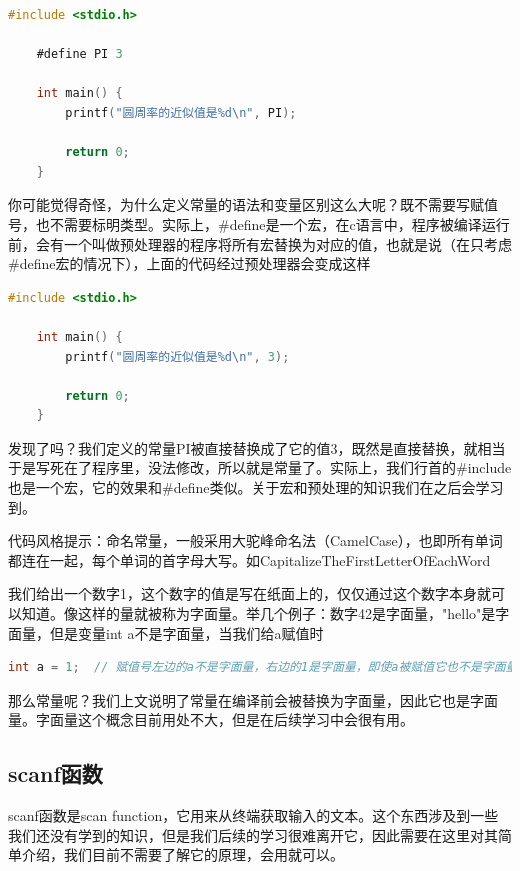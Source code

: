 \begin{lstlisting}[language=C]
    #include <stdio.h>

    #define PI 3

    int main() {
        printf("圆周率的近似值是%d\n", PI);

        return 0;
    }
\end{lstlisting}

你可能觉得奇怪，为什么定义常量的语法和变量区别这么大呢？既不需要写赋值号，也不需要标明类型。实际上，\#define是一个宏，在c语言中，程序被编译运行前，会有一个叫做预处理器的程序将所有宏替换为对应的值，也就是说（在只考虑\#define宏的情况下），上面的代码经过预处理器会变成这样

\begin{lstlisting}[language=C]
    #include <stdio.h>

    int main() {
        printf("圆周率的近似值是%d\n", 3);

        return 0;
    }
\end{lstlisting}

发现了吗？我们定义的常量PI被直接替换成了它的值$3$，既然是直接替换，就相当于是写死在了程序里，没法修改，所以就是常量了。实际上，我们行首的\#include也是一个宏，它的效果和\#define类似。关于宏和预处理的知识我们在之后会学习到。

代码风格提示：命名常量，一般采用大驼峰命名法（CamelCase），也即所有单词都连在一起，每个单词的首字母大写。如CapitalizeTheFirstLetterOfEachWord

我们给出一个数字1，这个数字的值是写在纸面上的，仅仅通过这个数字本身就可以知道。像这样的量就被称为字面量。举几个例子：数字42是字面量，"hello"是字面量，但是变量int a不是字面量，当我们给a赋值时

\begin{lstlisting}[language=C]
    int a = 1;  // 赋值号左边的a不是字面量，右边的1是字面量，即使a被赋值它也不是字面量，因为你无法仅仅从a这个名字本身判断它的值
\end{lstlisting}

那么常量呢？我们上文说明了常量在编译前会被替换为字面量，因此它也是字面量。字面量这个概念目前用处不大，但是在后续学习中会很有用。

\subsection{scanf函数}

scanf函数是scan function，它用来从终端获取输入的文本。这个东西涉及到一些我们还没有学到的知识，但是我们后续的学习很难离开它，因此需要在这里对其简单介绍，我们目前不需要了解它的原理，会用就可以。

